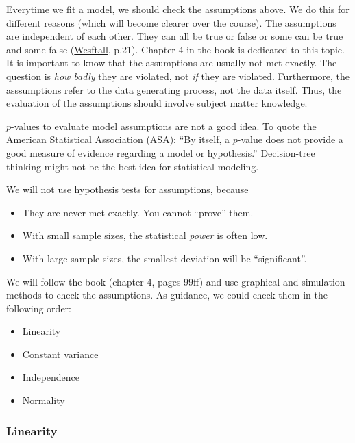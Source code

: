 \documentclass[
]{book}
\providecommand{\tightlist}{%
  \setlength{\itemsep}{0pt}\setlength{\parskip}{0pt}}
\begin{document}
Everytime we fit a model, we should check the assumptions \hyperref[_model_assumptions]{above}.
We do this for different reasons (which will become clearer over the course).
The assumptions are independent of each other.
They can all be true or false or some can be true and some false
(\href{https://www.routledge.com/Understanding-Regression-Analysis-A-Conditional-Distribution-Approach/Westfall-Arias/p/book/9780367493516?srsltid=AfmBOore3O_Ciecl0TTkr9AjPIY1d6OmbQa7o7IAdKpTSkD8s9HkwzD4}{Wesftall}, p.21).
Chapter 4 in the book is dedicated to this topic. It is important to know
that the assumptions are usually not met exactly. The question is \emph{how badly} they are violated,
not \emph{if} they are violated.
Furthermore, the asssumptions refer to the data generating process, not the data itself.
Thus, the evaluation of the assumptions should involve subject matter knowledge.

\(p\)-values to evaluate model assumptions are not a good idea. To \href{https://www.tandfonline.com/doi/full/10.1080/00031305.2016.1154108\#d1e949}{quote} the
American Statistical Association (ASA): ``By itself, a \(p\)-value does not provide a good measure
of evidence regarding a model or hypothesis.''
Decision-tree thinking might not be the best idea for statistical modeling.

We will not use hypothesis tests for assumptions, because

\begin{itemize}
\tightlist
\item
  They are never met exactly. You cannot ``prove'' them.
\item
  With small sample sizes, the statistical \emph{power} is often low.
\item
  With large sample sizes, the smallest deviation will be ``significant''.
\end{itemize}

We will follow the book (chapter 4, pages 99ff) and use graphical and simulation methods to check the assumptions.
As guidance, we could check them in the following order:

\begin{itemize}
\tightlist
\item
  Linearity
\item
  Constant variance
\item
  Independence
\item
  Normality
\end{itemize}

\subsubsection{Linearity}\label{linearity}
\end{document}
